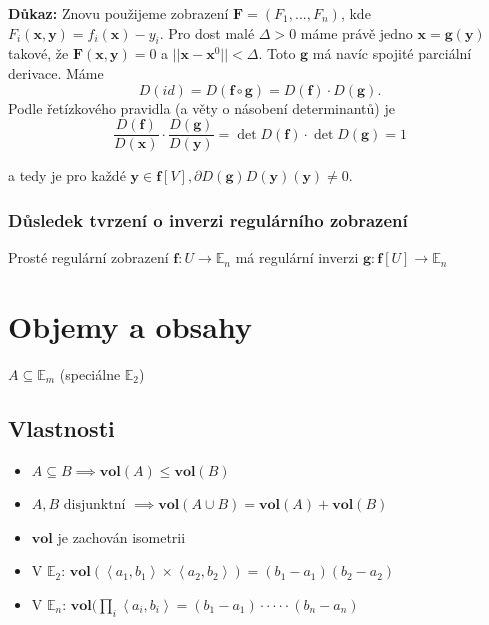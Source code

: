 \documentclass[10pt]{article}
\begin{document}
\vspace{5mm}
\noindent
\textbf{Důkaz:} Znovu použijeme zobrazení $\textbf{F} = (F_1,...,F_n)$, kde $F_i(\textbf{x},\textbf{y}) = f_i(\textbf{x})-y_i$. Pro dost malé 
$\Delta > 0$ máme právě jedno $\textbf{x} = \textbf{g}(\textbf{y})$ takové, že $\textbf{F}(\textbf{x},\textbf{y}) = 0$ a $||\textbf{x} - \textbf{x}^0|| < \Delta$.
Toto $\textbf{g}$ má navíc spojité parciální derivace. Máme
\[D(id) = D(\textbf{f}\circ\textbf{g}) = D(\textbf{f})\cdot D(\textbf{g}).\]
Podle řetízkového pravidla (a věty o násobení determinantů) je 
\[\frac{D(\textbf{f})}{D(\textbf{x})}\cdot\frac{D(\textbf{g})}{D(\textbf{y})} = \det D(\textbf{f})\cdot \det D(\textbf{g}) = 1\]

a tedy je pro každé $\textbf{y} \in \textbf{f}[V], \partial{D(\textbf{g})}{D(\textbf{y})}(\textbf{y}) \neq 0$.

\subsubsection{Důsledek tvrzení o inverzi regulárního zobrazení}
\hspace{1.2mm}
\noindent
Prosté regulární zobrazení $\mathbf{f}: U \to \mathbb{E}_n$ má regulární inverzi
$\mathbf{g}: \mathbf{f}[U] \to \mathbb{E}_n$

\section{Objemy a obsahy}
\hspace{1.2mm}
$A \subseteq \mathbb{E}_m$ (speciálne $\mathbb{E}_2$)
\noindent

\subsection{Vlastnosti}
\hspace{1.2mm}
\begin{itemize}
    \item $A \subseteq B \implies \mathbf{vol}(A) \leq \mathbf{vol}(B)$
    \item $A, B \text{ disjunktní } \implies \mathbf{vol}(A \cup B) = \mathbf{vol}(A) + \mathbf{vol}(B)$
    \item $\mathbf{vol}$ je zachován isometrii
    \item V $\mathbb{E}_2$: $\mathbf{vol}(\left<a_1,b_1\right>\times \left<a_2,b_2\right>) = (b_1 - a_1)(b_2 - a_2)$
    \item V $\mathbb{E}_n$: $\mathbf{vol}(\prod_i \left<a_i,b_i\right> = (b_1 - a_1) \cdot \cdot \cdot \cdot \cdot (b_n-a_n)$
\end{itemize}
\end{document}
